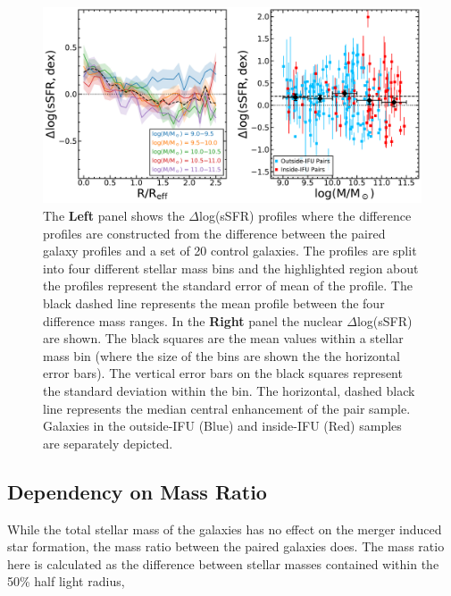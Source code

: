 \documentclass[iop,revtex4,twocolumn,apj,numberedappendix,appendixfloats]{emulateapj}
\begin{document}

\begin{figure}
\centering
\includegraphics[width=\linewidth]{fig/ssfr_mass.pdf}
\caption[]{The \textbf{Left} panel shows the $\Delta$log(sSFR) profiles where the difference profiles are constructed from the difference between the paired galaxy profiles and a set of 20 control galaxies. The profiles are split into four different stellar mass bins and the highlighted region about the profiles represent the standard error of mean of the profile. The black dashed line represents the mean profile between the four difference mass ranges. In the \textbf{Right} panel the nuclear $\Delta$log(sSFR) are shown. The black squares are the mean values within a stellar mass bin (where the size of the bins are shown the the horizontal error bars). The vertical error bars on the black squares represent the standard deviation within the bin. The horizontal, dashed black line represents the median central enhancement of the pair sample. Galaxies in the outside-IFU (Blue) and inside-IFU (Red) samples are separately depicted.}
\label{fig:ssfr_mass}
\end{figure}

\subsection{Dependency on Mass Ratio}
While the total stellar mass of the galaxies has no effect on the merger induced star formation, the mass ratio between the paired galaxies does. The mass ratio here is calculated as the difference between stellar masses contained within the 50\% half light radius, 
\end{document}
